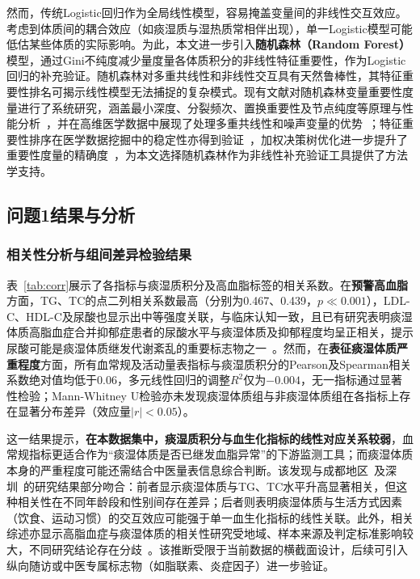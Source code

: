 \documentclass[a4paper,12pt]{ctexart}
\begin{document}
然而，传统Logistic回归作为全局线性模型，容易掩盖变量间的非线性交互效应。考虑到体质间的耦合效应（如痰湿质与湿热质常相伴出现），单一Logistic模型可能低估某些体质的实际影响。为此，本文进一步引入\textbf{随机森林（Random Forest）}模型，通过Gini不纯度减少量度量各体质积分的非线性特征重要性，作为Logistic回归的补充验证。随机森林对多重共线性和非线性交互具有天然鲁棒性，其特征重要性排名可揭示线性模型无法捕捉的复杂模式。现有文献对随机森林变量重要性度量进行了系统研究，涵盖最小深度、分裂频次、置换重要性及节点纯度等原理与性能分析~\cite{cao2022rf}，并在高维医学数据中展现了处理多重共线性和噪声变量的优势~\cite{yao2016medical}；特征重要性排序在医学数据挖掘中的稳定性亦得到验证~\cite{huang2020kanonymity}，加权决策树优化进一步提升了重要性度量的精确度~\cite{ma2017rf}，为本文选择随机森林作为非线性补充验证工具提供了方法学支持。

\subsection{问题1结果与分析}

\subsubsection{相关性分析与组间差异检验结果}
表~\ref{tab:corr}展示了各指标与痰湿质积分及高血脂标签的相关系数。在\textbf{预警高血脂}方面，TG、TC的点二列相关系数最高（分别为0.467、0.439，$p\ll0.001$），LDL-C、HDL-C及尿酸也显示出中等强度关联，与临床认知一致，且已有研究表明痰湿体质高脂血症合并抑郁症患者的尿酸水平与痰湿体质及抑郁程度均呈正相关，提示尿酸可能是痰湿体质继发代谢紊乱的重要标志物之一~\cite{min2024phlegm}。然而，在\textbf{表征痰湿体质严重程度}方面，所有血常规及活动量表指标与痰湿质积分的Pearson及Spearman相关系数绝对值均低于0.06，多元线性回归的调整$R^2$仅为$-0.004$，无一指标通过显著性检验；Mann-Whitney U检验亦未发现痰湿体质组与非痰湿体质组在各指标上存在显著分布差异（效应量$|r|<0.05$）。

这一结果提示，\textbf{在本数据集中，痰湿质积分与血生化指标的线性对应关系较弱}，血常规指标更适合作为``痰湿体质是否已继发血脂异常''的下游监测工具；而痰湿体质本身的严重程度可能还需结合中医量表信息综合判断。该发现与成都地区~\cite{jia2021chengdu}及深圳~\cite{huang2025t2dm}的研究结果部分吻合：前者显示痰湿体质与TG、TC水平升高显著相关，但这种相关性在不同年龄段和性别间存在差异；后者则表明痰湿体质与生活方式因素（饮食、运动习惯）的交互效应可能强于单一血生化指标的线性关联。此外，相关综述亦显示高脂血症与痰湿体质的相关性研究受地域、样本来源及判定标准影响较大，不同研究结论存在分歧~\cite{yu2020hyperlipid}。该推断受限于当前数据的横截面设计，后续可引入纵向随访或中医专属标志物（如脂联素、炎症因子）进一步验证。
\end{document}
